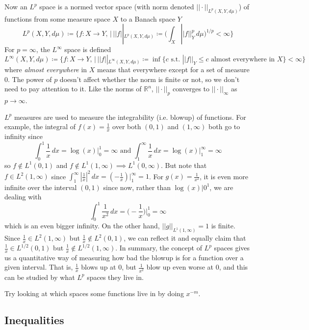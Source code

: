 \documentclass{article}
\theoremstyle{remark}
\theoremstyle{definition}
\begin{document}
Now an $L^p$ space is a normed vector space (with norm denoted $||\cdot ||_{L^p (X, Y, d\mu)}$) of functions from some measure space $X$ to a Banach space $Y$ 
\[L^p (X, Y, d\mu) \coloneqq \Big\{ f: X \longrightarrow Y, \,|\, ||f||_{L^p(X, Y, d\mu)} \coloneqq \bigg(\int_X ||f||_Y^p \, d\mu \bigg) ^{1/p} < \infty \Big\}\]
For $p = \infty$, the $L^\infty$ space is defined 
\[L^\infty (X, Y, d\mu) \coloneqq \Big\{ f: X \longrightarrow Y, \,|\, ||f||_{L^\infty (X, Y, d\mu)} \coloneqq \inf\{c \text{ s.t. } ||f||_Y \leq c \text{ almost everywhere in } X\} < \infty \Big\}\]
where \textit{almost everywhere} in $X$ means that everywhere except for a set of measure $0$. The power of $p$ doesn't affect whether the norm is finite or not, so we don't need to pay attention to it. Like the norms of $\mathbb{R}^n$, $|| \cdot ||_p$ converges to $|| \cdot ||_\infty$ as $p \rightarrow \infty$. 

$L^p$ measures are used to measure the integrability (i.e. blowup) of functions. For example, the integral of $f(x) = \frac{1}{x}$ over both $(0, 1)$ and $(1, \infty)$ both go to infinity since 
\[\int_0^1 \frac{1}{x}\,dx = \log(x) \big|^1_0 = \infty \text{ and } \int_1^\infty \frac{1}{x} \, dx = \log(x) \big|_1^\infty = \infty\]
so $f \not\in L^1 (0, 1)$ and $f \not\in L^1 (1, \infty) \implies L^1 (0, \infty)$. But note that $f \in L^2 (1, \infty)$ since $\int_1^\infty |\frac{1}{x}|^2 \,dx = (-\frac{1}{x}) \big|_1^\infty = 1$. For $g(x) = \frac{1}{x^2}$, it is even more infinite over the interval $(0, 1)$ since now, rather than $\log(x)\big|0^1$, we are dealing with 
\[\int_0^1 \frac{1}{x^2} \,dx = \Big( -\frac{1}{x}\Big) \Big|_0^1 = \infty \]
which is an even bigger infinity. On the other hand, $||g||_{L^1 (1, \infty)} = 1$ is finite. Since $\frac{1}{x} \in L^2 (1, \infty)$ but $\frac{1}{x} \not\in L^2 (0, 1)$, we can reflect it and equally claim that $\frac{1}{x} \in L^{1/2} (0, 1)$ but $\frac{1}{x} \not\in L^{1/2}(1, \infty)$. In summary, the concept of $L^p$ spaces gives us a quantitative way of measuring how bad the blowup is for a function over a given interval. That is, $\frac{1}{x}$ blows up at $0$, but $\frac{1}{x^2}$ blow up even worse at $0$, and this can be studied by what $L^p$ spaces they live in.  

Try looking at which spaces some functions live in by doing $x^{-m}$. 

\subsection{Inequalities}
\end{document}
